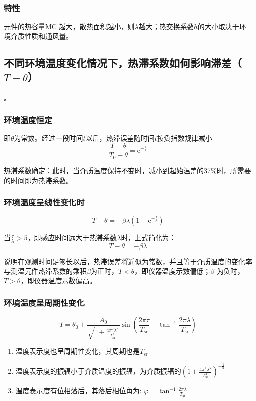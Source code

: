 \documentclass[UTF8,11pt]{ctexbook}
\begin{document}
\subsubsection{特性}

元件的热容量MC 越大，散热面积越小，则\(\lambda\)越大；热交换系数\(h\)的大小取决于环境介质性质和通风量。

\subsection{不同环境温度变化情况下，热滞系数如何影响滞差（\(T-\theta\)）}。

\subsubsection{环境温度恒定}

即\(\theta\)为常数。经过一段时间\(t\)以后，热滞误差随时间\(t\)按负指数规律减小
\[
\frac{T-\theta}{T_0-\theta}=\mathrm{e}^{-\frac{\tau}{\lambda}}
\]

热滞系数确定：此时，当介质温度保持不变时，减小到起始温差的37\%时，所需要的时间即为热滞系数。

\subsubsection{环境温度呈线性变化时}
\[
T-\theta=-\beta\lambda\left(1-\mathrm{e}^{-\frac{\tau}{\lambda}}\right)
\]

当\(\frac{\tau}{\lambda}>5\)，即感应时间远大于热滞系数\(\lambda\)时，上式简化为：
\[
T-\theta=-\beta\lambda
\]

说明在观测时间足够长以后，热滞误差将近似为常数，并且等于介质温度的变化率与测温元件热滞系数的乘积\(\beta\)为正时，\(T<\theta\)，即仪器温度示数偏低；\(\beta\) 为负时，\(T>\theta\)，即仪器温度示数偏高。

\subsubsection{环境温度呈周期性变化}
\[
T=\theta_0+\frac{A_0}{\sqrt{1+\frac{4\pi^2\lambda^2}{T_\mathrm{sr}^2}}}\sin\left(\frac{2\pi\tau}{T_\mathrm{sr}}-\tan^{-1}\frac{2\pi\lambda}{T_\mathrm{sr}}\right)
\]
\begin{enumerate}
    \item 温度表示度也呈周期性变化，其周期也是\(T_\mathrm{sr}\)
    \item 温度表示度的振辐小于介质温度的振辐，为介质振辐的\(\left(1+\frac{4\pi^2\lambda^2}{T_\mathrm{sr}^2}\right)^{-\frac{1}{2}}\)
    \item 温度表示度有位相落后，其落后相位角为: \(\varphi=\tan^{-1}\frac{2\pi\lambda}{T_\mathrm{st}}\)
\end{enumerate}
\end{document}
